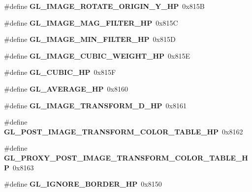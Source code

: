 \begin{DoxyCompactItemize}
\item 
\#define {\bfseries G\+L\+\_\+\+I\+M\+A\+G\+E\+\_\+\+R\+O\+T\+A\+T\+E\+\_\+\+O\+R\+I\+G\+I\+N\+\_\+\+Y\+\_\+\+H\+P}~0x815\+B\label{_s_d_l__opengl_8h_adf3d126b7e9cbf89377c4e361ed362e1}

\item 
\#define {\bfseries G\+L\+\_\+\+I\+M\+A\+G\+E\+\_\+\+M\+A\+G\+\_\+\+F\+I\+L\+T\+E\+R\+\_\+\+H\+P}~0x815\+C\label{_s_d_l__opengl_8h_ace2e09289afcc0a60d082dd6b857195e}

\item 
\#define {\bfseries G\+L\+\_\+\+I\+M\+A\+G\+E\+\_\+\+M\+I\+N\+\_\+\+F\+I\+L\+T\+E\+R\+\_\+\+H\+P}~0x815\+D\label{_s_d_l__opengl_8h_acac8c9c8d17320803c525de39c99059e}

\item 
\#define {\bfseries G\+L\+\_\+\+I\+M\+A\+G\+E\+\_\+\+C\+U\+B\+I\+C\+\_\+\+W\+E\+I\+G\+H\+T\+\_\+\+H\+P}~0x815\+E\label{_s_d_l__opengl_8h_a78ed0b9bd253794d2c41835dec2e7beb}

\item 
\#define {\bfseries G\+L\+\_\+\+C\+U\+B\+I\+C\+\_\+\+H\+P}~0x815\+F\label{_s_d_l__opengl_8h_a1ddeb0c5eb581940ac588c56ebb84b68}

\item 
\#define {\bfseries G\+L\+\_\+\+A\+V\+E\+R\+A\+G\+E\+\_\+\+H\+P}~0x8160\label{_s_d_l__opengl_8h_aae60ee0f07c5b7ae96176f163546194c}

\item 
\#define {\bfseries G\+L\+\_\+\+I\+M\+A\+G\+E\+\_\+\+T\+R\+A\+N\+S\+F\+O\+R\+M\+\_\+D\+\_\+\+H\+P}~0x8161\label{_s_d_l__opengl_8h_a17928a5390c0feb85b6998a73f2d08a2}

\item 
\#define {\bfseries G\+L\+\_\+\+P\+O\+S\+T\+\_\+\+I\+M\+A\+G\+E\+\_\+\+T\+R\+A\+N\+S\+F\+O\+R\+M\+\_\+\+C\+O\+L\+O\+R\+\_\+\+T\+A\+B\+L\+E\+\_\+\+H\+P}~0x8162\label{_s_d_l__opengl_8h_ad88f4dc3e570a35e10d3e1e5d2a7144e}

\item 
\#define {\bfseries G\+L\+\_\+\+P\+R\+O\+X\+Y\+\_\+\+P\+O\+S\+T\+\_\+\+I\+M\+A\+G\+E\+\_\+\+T\+R\+A\+N\+S\+F\+O\+R\+M\+\_\+\+C\+O\+L\+O\+R\+\_\+\+T\+A\+B\+L\+E\+\_\+\+H\+P}~0x8163\label{_s_d_l__opengl_8h_ac78cbe27b2599501b782528829a6dff0}

\item 
\#define {\bfseries G\+L\+\_\+\+I\+G\+N\+O\+R\+E\+\_\+\+B\+O\+R\+D\+E\+R\+\_\+\+H\+P}~0x8150\label{_s_d_l__opengl_8h_acc17d8aa1369423e27b27cc9a19f54c8}


\end{DoxyCompactItemize}
